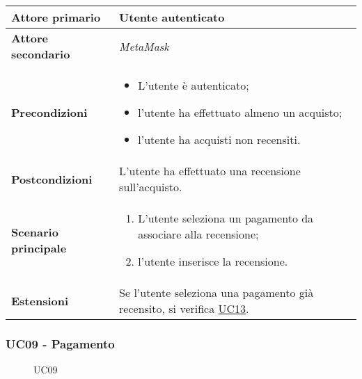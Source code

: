             \begin{center}
                \renewcommand{\arraystretch}{1.5}
                \begin{tabular}{m{10em} m{20em}}
                    \hline
                    \textbf{Attore primario} & Utente autenticato \\
                    \hline
                    \textbf{Attore secondario} & \textit{MetaMask} \\
                    \hline
                    \textbf{Precondizioni} &
                        \begin{itemize}
                            \item L'utente è autenticato;
                            \item l'utente ha effettuato almeno un acquisto;
                            \item l'utente ha acquisti non recensiti.
                        \end{itemize} \\
                    \hline
                    \textbf{Postcondizioni} & L'utente ha effettuato una recensione sull'acquisto. \\
                    \hline
                    \textbf{Scenario principale} &
                        \begin{enumerate}
                            \item L'utente seleziona un pagamento da associare alla recensione;
                            \item l'utente inserisce la recensione.
                        \end{enumerate} \\
                    \hline
                    \textbf{Estensioni} & Se l'utente seleziona una pagamento già recensito, si verifica \hyperref[UC13]{UC13}. \\
                    \hline
                \end{tabular}
            \end{center}

        \subsubsection{UC09 - Pagamento}
        \label{UC09}

            \begin{figure}[H]
                \centering
                
                \caption{UC09}
            \end{figure}

